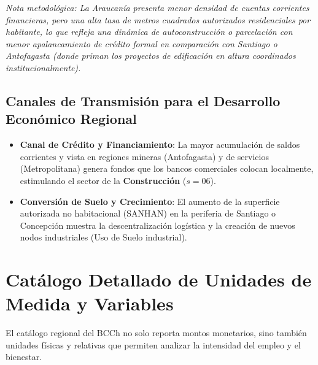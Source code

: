 \documentclass[11pt,a4paper]{article}
\begin{document}
\textit{Nota metodológica: La Araucanía presenta menor densidad de cuentas corrientes financieras, pero una alta tasa de metros cuadrados autorizados residenciales por habitante, lo que refleja una dinámica de autoconstrucción o parcelación con menor apalancamiento de crédito formal en comparación con Santiago o Antofagasta (donde priman los proyectos de edificación en altura coordinados institucionalmente).}


\subsection{Canales de Transmisión para el Desarrollo Económico Regional}
\begin{itemize}
  \item \textbf{Canal de Crédito y Financiamiento}: La mayor acumulación de saldos corrientes y vista en regiones mineras (Antofagasta) y de servicios (Metropolitana) genera fondos que los bancos comerciales colocan localmente, estimulando el sector de la \textbf{Construcción} ($s = 06$).
  \item \textbf{Conversión de Suelo y Crecimiento}: El aumento de la superficie autorizada no habitacional (SANHAN) en la periferia de Santiago o Concepción muestra la descentralización logística y la creación de nuevos nodos industriales (Uso de Suelo industrial).

\end{itemize}

\strut


\section{Catálogo Detallado de Unidades de Medida y Variables}

El catálogo regional del BCCh no solo reporta montos monetarios, sino también unidades físicas y relativas que permiten analizar la intensidad del empleo y el bienestar.
\end{document}
